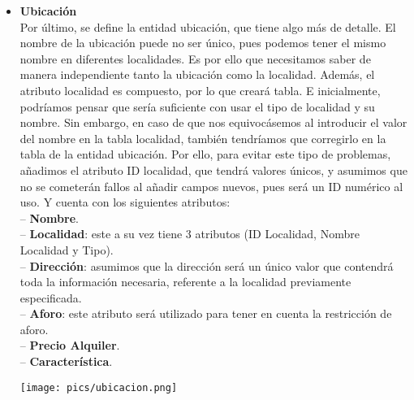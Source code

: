 \documentclass[12pt]{article}
\begin{document}
\begin{itemize}
        \item \textbf{Ubicación}\\
            Por último, se define la entidad ubicación, que tiene algo más de detalle. El nombre de la ubicación puede no ser único, pues podemos tener el mismo
            nombre en diferentes localidades. Es por ello que necesitamos saber de manera independiente tanto la ubicación como la localidad.
            Además, el atributo localidad es compuesto, por lo que creará tabla. E inicialmente, podríamos pensar que sería suficiente con usar el tipo de localidad 
            y su nombre. Sin embargo, en caso de que nos equivocásemos al introducir el valor del nombre en la tabla localidad, también tendríamos que corregirlo
            en la tabla de la entidad ubicación. Por ello, para evitar este tipo de problemas, añadimos el atributo ID localidad, que tendrá valores únicos, 
            y asumimos que no se cometerán fallos al añadir campos nuevos, pues será un ID numérico al uso. 
            Y cuenta con los siguientes atributos: \\
                \hspace{0.5cm} -- {\bfseries Nombre}. \\
                \hspace{0.5cm} -- {\bfseries Localidad}: este a su vez tiene 3 atributos (ID Localidad, Nombre Localidad y Tipo). \\
                \hspace{0.5cm} -- {\bfseries Dirección}: asumimos que la dirección será un único valor que contendrá toda la información necesaria,
                referente a la localidad previamente especificada. \\
                \hspace{0.5cm} -- {\bfseries Aforo}: este atributo será utilizado para tener en cuenta la restricción de aforo. \\
                \hspace{0.5cm} -- {\bfseries Precio Alquiler}. \\
                \hspace{0.5cm} -- {\bfseries Característica}. \\
            \begin{center}
            {\texttt{[image: pics/ubicacion.png]}}
            \end{center}

    
    \end{itemize}
\end{document}
